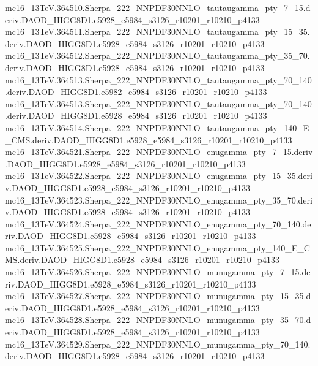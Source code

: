 \begin{footnotesize}
mc16\_13TeV.364510.Sherpa\_222\_NNPDF30NNLO\_tautaugamma\_pty\_7\_15.deriv.DAOD\_HIGG8D1.e5928\_e5984\_s3126\_r10201\_r10210\_p4133 \\
mc16\_13TeV.364511.Sherpa\_222\_NNPDF30NNLO\_tautaugamma\_pty\_15\_35.deriv.DAOD\_HIGG8D1.e5928\_e5984\_s3126\_r10201\_r10210\_p4133 \\
mc16\_13TeV.364512.Sherpa\_222\_NNPDF30NNLO\_tautaugamma\_pty\_35\_70.deriv.DAOD\_HIGG8D1.e5928\_e5984\_s3126\_r10201\_r10210\_p4133 \\
mc16\_13TeV.364513.Sherpa\_222\_NNPDF30NNLO\_tautaugamma\_pty\_70\_140.deriv.DAOD\_HIGG8D1.e5982\_e5984\_s3126\_r10201\_r10210\_p4133 \\
mc16\_13TeV.364513.Sherpa\_222\_NNPDF30NNLO\_tautaugamma\_pty\_70\_140.deriv.DAOD\_HIGG8D1.e5928\_e5984\_s3126\_r10201\_r10210\_p4133 \\
mc16\_13TeV.364514.Sherpa\_222\_NNPDF30NNLO\_tautaugamma\_pty\_140\_E\_CMS.deriv.DAOD\_HIGG8D1.e5928\_e5984\_s3126\_r10201\_r10210\_p4133 \\
mc16\_13TeV.364521.Sherpa\_222\_NNPDF30NNLO\_enugamma\_pty\_7\_15.deriv.DAOD\_HIGG8D1.e5928\_e5984\_s3126\_r10201\_r10210\_p4133 \\
mc16\_13TeV.364522.Sherpa\_222\_NNPDF30NNLO\_enugamma\_pty\_15\_35.deriv.DAOD\_HIGG8D1.e5928\_e5984\_s3126\_r10201\_r10210\_p4133 \\
mc16\_13TeV.364523.Sherpa\_222\_NNPDF30NNLO\_enugamma\_pty\_35\_70.deriv.DAOD\_HIGG8D1.e5928\_e5984\_s3126\_r10201\_r10210\_p4133 \\
mc16\_13TeV.364524.Sherpa\_222\_NNPDF30NNLO\_enugamma\_pty\_70\_140.deriv.DAOD\_HIGG8D1.e5928\_e5984\_s3126\_r10201\_r10210\_p4133 \\
mc16\_13TeV.364525.Sherpa\_222\_NNPDF30NNLO\_enugamma\_pty\_140\_E\_CMS.deriv.DAOD\_HIGG8D1.e5928\_e5984\_s3126\_r10201\_r10210\_p4133 \\
mc16\_13TeV.364526.Sherpa\_222\_NNPDF30NNLO\_munugamma\_pty\_7\_15.deriv.DAOD\_HIGG8D1.e5928\_e5984\_s3126\_r10201\_r10210\_p4133 \\
mc16\_13TeV.364527.Sherpa\_222\_NNPDF30NNLO\_munugamma\_pty\_15\_35.deriv.DAOD\_HIGG8D1.e5928\_e5984\_s3126\_r10201\_r10210\_p4133 \\
mc16\_13TeV.364528.Sherpa\_222\_NNPDF30NNLO\_munugamma\_pty\_35\_70.deriv.DAOD\_HIGG8D1.e5928\_e5984\_s3126\_r10201\_r10210\_p4133 \\
mc16\_13TeV.364529.Sherpa\_222\_NNPDF30NNLO\_munugamma\_pty\_70\_140.deriv.DAOD\_HIGG8D1.e5928\_e5984\_s3126\_r10201\_r10210\_p4133 \\

\end{footnotesize}

